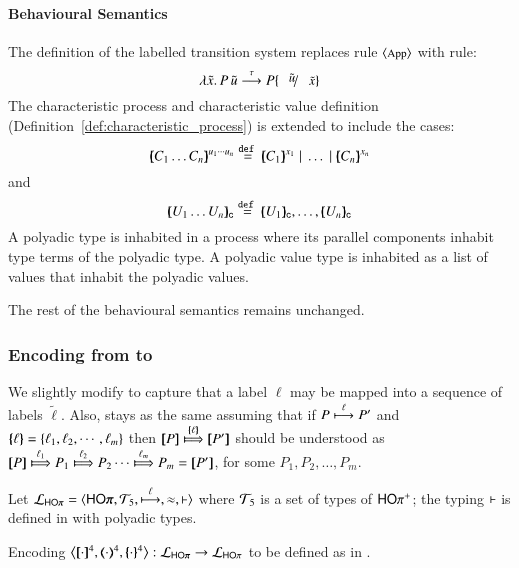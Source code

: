 
\paragraph{Behavioural Semantics}
The definition of the labelled transition system
replaces rule ${\footnotesize \langle \textrm{App} \rangle}$ with rule:
%
\[
	\appl{\abs{\tilde{x}} P}{\tilde{u}} \by{\tau} P\subst{\tilde{u}}{\tilde{x}}
\]
%
The characteristic process and characteristic value 
definition (Definition~\ref{def:characteristic_process})
is extended to include the cases:
\[
	\mapchar{C_1 \dots C_n}{u_1 \cdots u_n} \defeq \mapchar{C_1}{x_1} \Par \dots \Par \mapchar{C_n}{x_n}
\]
\noi and
\[
	\omapchar{U_1 \dots U_n} \defeq \omapchar{U_1}, \dots, \omapchar{U_n}
\]
%
A polyadic type is inhabited in a process where its
parallel components inhabit type terms of the polyadic
type. A polyadic value type is inhabited as a list
of values that inhabit the polyadic values.

The rest of the behavioural semantics remains unchanged.


\subsubsection{Encoding from \pHOp to \HOp}

We slightly modify  to capture that a 
label $\ell$ may be mapped into a sequence of labels $\tilde{\ell}$.
Also,  stays as the same
assuming that if 
$P \stackrel{\ell}{\longmapsto} P'$ and $\{\!\!\{\ell\}\!\!\} = \{\ell_1, \ell_2,  \cdots, \ell_m\}$ then
$\map{P} \Hby{\mapa{\ell}} \map{P'}$
should be understood as
$\map{P} \Hby{\ell_1} P_1 \Hby{\ell_2} P_2 \cdots \Hby{\ell_m} P_m =  \map{P'}$,
for some
$P_1, P_2, \ldots, P_m$.

Let $\tyl{L}_{\pHOp}=\calc{\pHOp}{{\cal{T}}_5}{\hby{\ell}}{\wb}{\proves}$
where 
${\cal{T}}_5$ is a set of types of $\mathsf{HO}\pi^{\mathsf +}$;  
the typing $\vdash$ is defined in 
 with polyadic types.

\begin{definition}\rm
	\label{def:enc:pHOp_to_HOp}
	Encoding $\enco{\pmap{\cdot}{4}, \tmap{\cdot}{4}, \mapa{\cdot}^{4}}: \tyl{L}_{\pHOp} \to \tyl{L}_{\HOp}$
	to be defined as in .
\end{definition}

